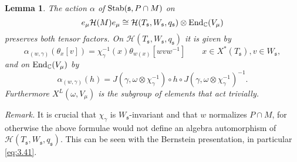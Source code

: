 \documentclass[11pt]{amsart}
\newtheorem{lem}[thm]{Lemma}
\theoremstyle{definition}
\begin{document}
\begin{lem}\label{lem:3.9}
The action $\alpha$ of ${{\rm Stab}} ({{\mathfrak s}},P \cap M)$ on  
\[
e_{\mu } {{\mathcal H}} (M) e_{\mu } \cong 
{{\mathcal H}} (T_{{\mathfrak s}}, W_{{\mathfrak s}}, q_{{\mathfrak s}}) \otimes {{\rm End}}_{\mathbb C} (V_{\mu }) 
\]
preserves both tensor factors. On ${{\mathcal H}} (T_{{\mathfrak s}}, W_{{\mathfrak s}}, q_{{\mathfrak s}})$ it is given by
\[
\alpha_{(w,\gamma)}(\theta_x [v]) = \chi_\gamma^{-1}(x) \theta_{w(x)} [w v w^{-1}] 
\qquad x \in X^* (T_{{\mathfrak s}}), v \in W_{{\mathfrak s}} ,
\]
and on ${{\rm End}}_{\mathbb C} (V_{\mu })$ by
\[
\alpha_{(w,\gamma)}(h) = J(\gamma,\omega \otimes \chi_\gamma^{-1}) \circ h \circ
J(\gamma,\omega \otimes \chi_\gamma^{-1})^{-1} .
\]
Furthermore $X^L (\omega,V_\mu)$ is the subgroup of elements that act trivially. 
\end{lem}
\emph{Remark.} It is crucial that $\chi_\gamma$ is $W_{{\mathfrak s}}$-invariant and that 
$w$ normalizes $P \cap M$, for otherwise the above formulae would not define 
an algebra automorphism of ${{\mathcal H}} (T_{{\mathfrak s}}, W_{{\mathfrak s}}, q_{{\mathfrak s}})$. This can 
be seen with the Bernstein presentation, in particular \eqref{eq:3.41}.
\end{document}
